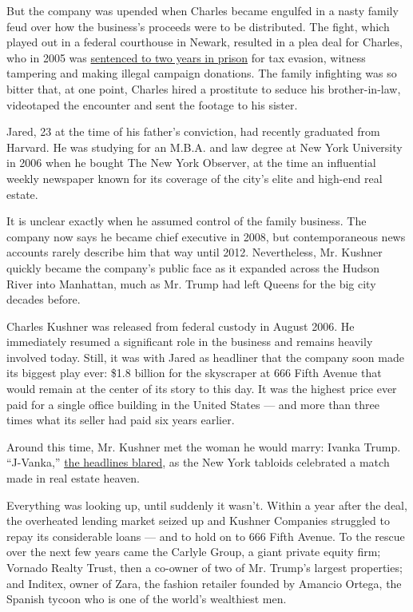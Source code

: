 But the company was upended when Charles became engulfed in a nasty
family feud over how the business's proceeds were to be distributed. The
fight, which played out in a federal courthouse in Newark, resulted in a
plea deal for Charles, who in 2005 was
\href{http://www.nytimes.com/2005/03/05/nyregion/democratic-donor-receives-twoyear-prison-sentence.html}{sentenced
to two years in prison} for tax evasion, witness tampering and making
illegal campaign donations. The family infighting was so bitter that, at
one point, Charles hired a prostitute to seduce his brother-in-law,
videotaped the encounter and sent the footage to his sister.

Jared, 23 at the time of his father's conviction, had recently graduated
from Harvard. He was studying for an M.B.A. and law degree at New York
University in 2006 when he bought The New York Observer, at the time an
influential weekly newspaper known for its coverage of the city's elite
and high-end real estate.

It is unclear exactly when he assumed control of the family business.
The company now says he became chief executive in 2008, but
contemporaneous news accounts rarely describe him that way until 2012.
Nevertheless, Mr. Kushner quickly became the company's public face as it
expanded across the Hudson River into Manhattan, much as Mr. Trump had
left Queens for the big city decades before.

Charles Kushner was released from federal custody in August 2006. He
immediately resumed a significant role in the business and remains
heavily involved today. Still, it was with Jared as headliner that the
company soon made its biggest play ever: \$1.8 billion for the
skyscraper at 666 Fifth Avenue that would remain at the center of its
story to this day. It was the highest price ever paid for a single
office building in the United States --- and more than three times what
its seller had paid six years earlier.

Around this time, Mr. Kushner met the woman he would marry: Ivanka
Trump. ``J-Vanka,''
\href{http://nymag.com/daily/intelligencer/2007/06/on_the_hunt_for_jvanka_at_the.html}{the
headlines blared}, as the New York tabloids celebrated a match made in
real estate heaven.

Everything was looking up, until suddenly it wasn't. Within a year after
the deal, the overheated lending market seized up and Kushner Companies
struggled to repay its considerable loans --- and to hold on to 666
Fifth Avenue. To the rescue over the next few years came the Carlyle
Group, a giant private equity firm; Vornado Realty Trust, then a
co-owner of two of Mr. Trump's largest properties; and Inditex, owner of
Zara, the fashion retailer founded by Amancio Ortega, the Spanish tycoon
who is one of the world's wealthiest men.

